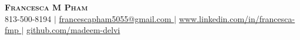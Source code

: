 \documentclass[letterpaper,10pt]{article}
\begin{document}
\begin{center}
    \textbf{\Huge \scshape Francesca M Pham} \\ \vspace{1pt}
    \small { 813-500-8194 } $|$ 
    \href{mailto:francescapham5055@gmail.com}
    { francescapham5055@gmail.com } $|$ 
    \href{www.linkedin.com/in/francesca-fmp}
    { www.linkedin.com/in/francesca-fmp } $|$
    \href{https://github.com/madeem-delvi}
    { github.com/madeem-delvi }
\end{center}






\end{document}
